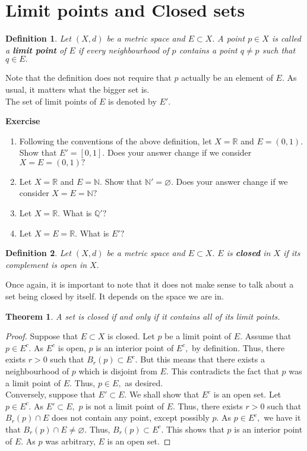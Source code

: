 \documentclass[12pt]{article}
\newtheorem{theorem}{Theorem}
\newtheorem{defn}{Definition}
\let\emptyset\varnothing
\newcounter{exercise}
\newcommand{\exercise}{\refstepcounter{exercise}\par\medskip
   {\textbf{Exercise \theexercise }} \rmfamily}
\begin{document}
	\section{Limit points and Closed sets}
	\begin{defn}
		Let $(X, d)$ be a metric space and $E \subset X.$ A point $p \in X$ is called a \textbf{limit point} of $E$ if \emph{every} neighbourhood of $p$ contains a point $q \neq p$ such that $q \in E.$
	\end{defn}
	Note that the definition does not require that $p$ actually be an element of $E.$ As usual, it matters what the bigger set is.\\
	The set of limit points of $E$ is denoted by $E'.$
	\exercise
	\begin{enumerate}[nosep] 
		\item Following the conventions of the above definition, let $X = \mathbb{R}$ and $E = (0, 1).$ Show that $E' = [0, 1].$ Does your answer change if we consider $X = E = (0, 1)?$
		\item Let $X = \mathbb{R}$ and $E = \mathbb{N}.$ Show that $\mathbb{N}' = \emptyset.$ Does your answer change if we consider $X = E = \mathbb{N}?$
		\item Let $X = \mathbb{R}.$ What is $\mathbb{Q}'?$
		\item Let $X = E = \mathbb{R}.$ What is $E'?$
	\end{enumerate}
	\begin{defn}
		Let $(X, d)$ be a metric space and $E \subset X.$ $E$ is \textbf{closed} in $X$ if its complement is open in $X.$
	\end{defn}
	Once again, it is important to note that it does not make sense to talk about a set being closed by itself. It depends on the space we are in. \\
	\begin{theorem}
		A set is closed if and only if it contains all of its limit points.
	\end{theorem}
	\begin{proof}
		Suppose that $E \subset X$ is closed. Let $p$ be a limit point of $E.$ Assume that $p \in E^c.$ As $E^c$ is open, $p$ is an interior point of $E^c,$ by definition. Thus, there exists $r > 0$ such that $B_r(p) \subset E^c.$ But this means that there exists a neighbourhood of $p$ which is disjoint from $E.$ This contradicts the fact that $p$ was a limit point of $E.$ Thus, $p \in E,$ as desired.\\
		Conversely, suppose that $E' \subset E.$ We shall show that $E^c$ is an open set. Let $p \in E^c.$ As $E' \subset E,$ $p$ is not a limit point of $E.$ Thus, there exists $r > 0$ such that $B_r(p) \cap E$ does not contain any point, except possibly $p.$ As $p \in E^c,$ we have it that $B_r(p) \cap E \neq \emptyset.$ Thus, $B_r(p) \subset E^c.$ This shows that $p$ is an interior point of $E.$ As $p$ was arbitrary, $E$ is an open set. 
	\end{proof}
\end{document}
